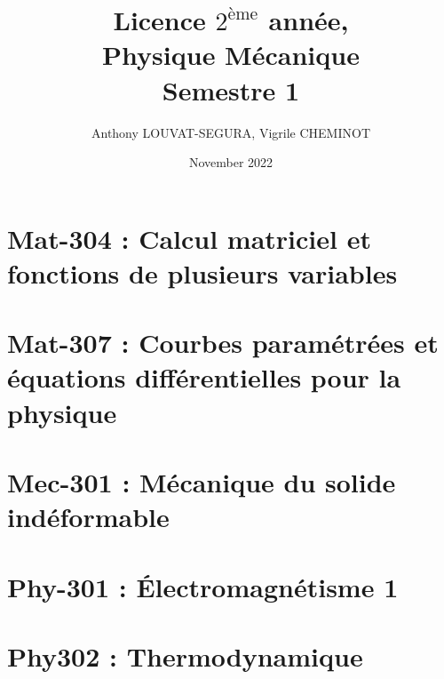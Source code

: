\documentclass[a4paper, 12pt, openright, twoside, french]{book}
\title{Licence $2^{\text{ème}}$ année,\\Physique Mécanique\\ Semestre 1}
\author{Anthony LOUVAT-SEGURA, Vigrile CHEMINOT}
\date{November 2022}
\begin{document}
\maketitle
\tableofcontents
\part{Mat-304 : Calcul matriciel et fonctions de plusieurs variables}

\part{Mat-307 : Courbes paramétrées et équations différentielles pour la physique}

\part{Mec-301 : Mécanique du solide indéformable}

\part{Phy-301 : Électromagnétisme 1}

\part{Phy302 : Thermodynamique}

%
%
%
%
\end{document}
